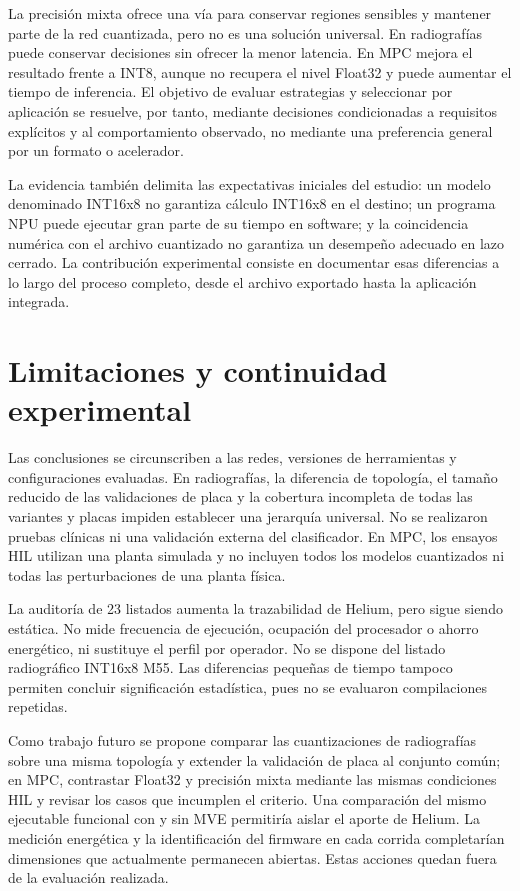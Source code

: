 La precisión mixta ofrece una vía para conservar regiones sensibles y mantener parte de la red cuantizada, pero no es una solución universal. En radiografías puede conservar decisiones sin ofrecer la menor latencia. En MPC mejora el resultado frente a INT8, aunque no recupera el nivel Float32 y puede aumentar el tiempo de inferencia. El objetivo de evaluar estrategias y seleccionar por aplicación se resuelve, por tanto, mediante decisiones condicionadas a requisitos explícitos y al comportamiento observado, no mediante una preferencia general por un formato o acelerador.

La evidencia también delimita las expectativas iniciales del estudio: un modelo denominado INT16x8 no garantiza cálculo INT16x8 en el destino; un programa NPU puede ejecutar gran parte de su tiempo en software; y la coincidencia numérica con el archivo cuantizado no garantiza un desempeño adecuado en lazo cerrado. La contribución experimental consiste en documentar esas diferencias a lo largo del proceso completo, desde el archivo exportado hasta la aplicación integrada.

\section{Limitaciones y continuidad experimental}
Las conclusiones se circunscriben a las redes, versiones de herramientas y configuraciones evaluadas. En radiografías, la diferencia de topología, el tamaño reducido de las validaciones de placa y la cobertura incompleta de todas las variantes y placas impiden establecer una jerarquía universal. No se realizaron pruebas clínicas ni una validación externa del clasificador. En MPC, los ensayos HIL utilizan una planta simulada y no incluyen todos los modelos cuantizados ni todas las perturbaciones de una planta física.

La auditoría de 23 listados aumenta la trazabilidad de Helium, pero sigue siendo estática. No mide frecuencia de ejecución, ocupación del procesador o ahorro energético, ni sustituye el perfil por operador. No se dispone del listado radiográfico INT16x8 M55. Las diferencias pequeñas de tiempo tampoco permiten concluir significación estadística, pues no se evaluaron compilaciones repetidas.

Como trabajo futuro se propone comparar las cuantizaciones de radiografías sobre una misma topología y extender la validación de placa al conjunto común; en MPC, contrastar Float32 y precisión mixta mediante las mismas condiciones HIL y revisar los casos que incumplen el criterio. Una comparación del mismo ejecutable funcional con y sin MVE permitiría aislar el aporte de Helium. La medición energética y la identificación del firmware en cada corrida completarían dimensiones que actualmente permanecen abiertas. Estas acciones quedan fuera de la evaluación realizada.

